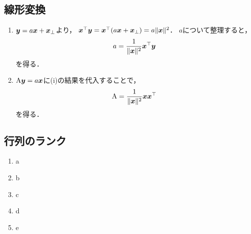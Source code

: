 \clearpage
\subsection{線形変換}
  \vspace{1mm}
  \begin{enumerate}[label=(\roman*)]
    \item $\boldsymbol{y} = a \boldsymbol{x} + \boldsymbol{x}_\perp$より，
      $\boldsymbol{x}^\top \boldsymbol{y} = \boldsymbol{x}^\top (a \boldsymbol{x} + \boldsymbol{x}_\perp) = a \| \boldsymbol{x} \|^2$．
      $a$について整理すると，
      \begin{equation}
        a = \frac{1}{\| \boldsymbol{x} \|^2} \boldsymbol{x}^\top \boldsymbol{y}
      \end{equation}
      を得る．
    \item $\mathrm{A} \boldsymbol{y} = a \boldsymbol{x}$に(i)の結果を代入することで，
      \begin{equation}
        \mathrm{A} = \frac{1}{\| \boldsymbol{x} \|^2} \boldsymbol{x} \boldsymbol{x}^\top
      \end{equation}
      を得る．
  \end{enumerate}

\clearpage
\subsection{行列のランク}
  \vspace{1mm}
  \begin{enumerate}[label=(\roman*)]
    \item a
    \item b
    \item c
    \item d
    \item e
  \end{enumerate}

\clearpage
